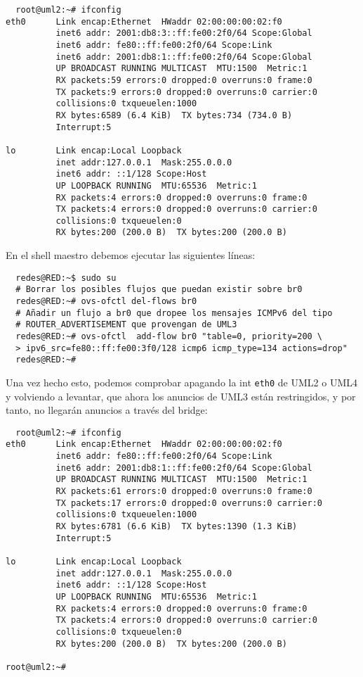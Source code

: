 \begin{verbatim}
  root@uml2:~# ifconfig
eth0      Link encap:Ethernet  HWaddr 02:00:00:00:02:f0  
          inet6 addr: 2001:db8:3::ff:fe00:2f0/64 Scope:Global
          inet6 addr: fe80::ff:fe00:2f0/64 Scope:Link
          inet6 addr: 2001:db8:1::ff:fe00:2f0/64 Scope:Global
          UP BROADCAST RUNNING MULTICAST  MTU:1500  Metric:1
          RX packets:59 errors:0 dropped:0 overruns:0 frame:0
          TX packets:9 errors:0 dropped:0 overruns:0 carrier:0
          collisions:0 txqueuelen:1000 
          RX bytes:6589 (6.4 KiB)  TX bytes:734 (734.0 B)
          Interrupt:5 

lo        Link encap:Local Loopback  
          inet addr:127.0.0.1  Mask:255.0.0.0
          inet6 addr: ::1/128 Scope:Host
          UP LOOPBACK RUNNING  MTU:65536  Metric:1
          RX packets:4 errors:0 dropped:0 overruns:0 frame:0
          TX packets:4 errors:0 dropped:0 overruns:0 carrier:0
          collisions:0 txqueuelen:0 
          RX bytes:200 (200.0 B)  TX bytes:200 (200.0 B)
\end{verbatim}

En el shell maestro debemos ejecutar las siguientes líneas:

\begin{verbatim}
  redes@RED:~$ sudo su
  # Borrar los posibles flujos que puedan existir sobre br0
  redes@RED:~# ovs-ofctl del-flows br0
  # Añadir un flujo a br0 que dropee los mensajes ICMPv6 del tipo
  # ROUTER_ADVERTISEMENT que provengan de UML3
  redes@RED:~# ovs-ofctl  add-flow br0 "table=0, priority=200 \
  > ipv6_src=fe80::ff:fe00:3f0/128 icmp6 icmp_type=134 actions=drop"
  redes@RED:~#
\end{verbatim}

Una vez hecho esto, podemos comprobar apagando la int \texttt{eth0} de UML2
o UML4 y volviendo a levantar, que ahora los anuncios de UML3 están restringidos,
y por tanto, no llegarán anuncios a través del bridge:

\begin{verbatim}
  root@uml2:~# ifconfig
eth0      Link encap:Ethernet  HWaddr 02:00:00:00:02:f0  
          inet6 addr: fe80::ff:fe00:2f0/64 Scope:Link
          inet6 addr: 2001:db8:1::ff:fe00:2f0/64 Scope:Global
          UP BROADCAST RUNNING MULTICAST  MTU:1500  Metric:1
          RX packets:61 errors:0 dropped:0 overruns:0 frame:0
          TX packets:17 errors:0 dropped:0 overruns:0 carrier:0
          collisions:0 txqueuelen:1000 
          RX bytes:6781 (6.6 KiB)  TX bytes:1390 (1.3 KiB)
          Interrupt:5 

lo        Link encap:Local Loopback  
          inet addr:127.0.0.1  Mask:255.0.0.0
          inet6 addr: ::1/128 Scope:Host
          UP LOOPBACK RUNNING  MTU:65536  Metric:1
          RX packets:4 errors:0 dropped:0 overruns:0 frame:0
          TX packets:4 errors:0 dropped:0 overruns:0 carrier:0
          collisions:0 txqueuelen:0 
          RX bytes:200 (200.0 B)  TX bytes:200 (200.0 B)

root@uml2:~#
\end{verbatim}


